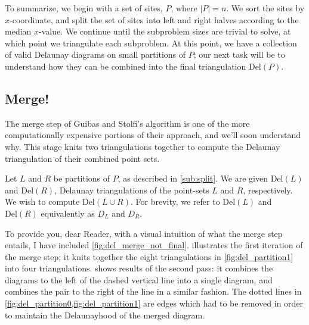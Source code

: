 \documentclass[12pt,twoside]{reedthesis}
\begin{document}
    To summarize, we begin with a set of sites, $P$, where $|P| = n$. We sort the sites by $x$-coordinate, and split the set of sites into left and right halves according to the median $x$-value. We continue until the subproblem sizes are trivial to solve, at which point we triangulate each subproblem. At this point, we have a collection of valid Delaunay diagrams on small partitions of $P$; our next task will be to understand how they can be combined into the final triangulation $\mbox{Del}(P)$.\par

    \subsection{Merge!}
    \label{sub:merge}
    The merge step of Guibas and Stolfi's algorithm is one of the more computationally expensive portions of their approach, and we'll soon understand why. This stage knits two triangulations together to compute the Delaunay triangulation of their combined point sets.\par 

    Let $L$ and $R$ be partitions of $P$, as described in \cref{sub:split}. We are given $\mbox{Del}(L)$ and $\mbox{Del}(R)$, Delaunay triangulations of the point-sets $L$ and $R$, respectively. We wish to compute $\mbox{Del}(L \cup R)$. For brevity, we refer to $\mbox{Del}(L)$ and $\mbox{Del}(R)$ equivalently as $D_{L}$ and $D_{R}$.\par

    To provide you, dear Reader, with a visual intuition of what the merge step entails, I have included \cref{fig:del_merge_not_final}.  illustrates the first iteration of the merge step; it knits together the eight triangulations in \cref{fig:del_partition1} into four triangulations.  shows results of the second pass: it combines the diagrams to the left of the dashed vertical line into a single diagram, and combines the pair to the right of the line in a similar fashion. The dotted lines in \cref{fig:del_partition0,fig:del_partition1} are edges which had to be removed in order to maintain the Delaunayhood of the merged diagram.\par
\end{document}

